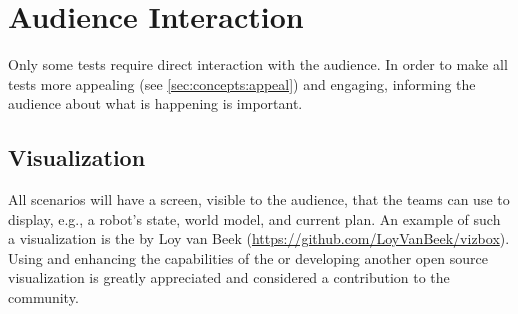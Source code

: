 \section{Audience Interaction}
\label{sec:rules:audience}
Only some tests require direct interaction with the audience. In order to make all tests more appealing (see \ref{sec:concepts:appeal}) and engaging, informing the audience about what is happening is important.

\subsection{Visualization}
\label{sec:rules:audience:visualization}
All scenarios will have a screen, visible to the audience, that the teams can use to display, e.g., a robot's state, world model, and current plan. An example of such a visualization is the \VizBox{} by Loy van Beek (\url{https://github.com/LoyVanBeek/vizbox}). Using and enhancing the capabilities of the \VizBox{} or developing another open source visualization is greatly appreciated and considered a contribution to the \RoboCup\AtHome{} community.
